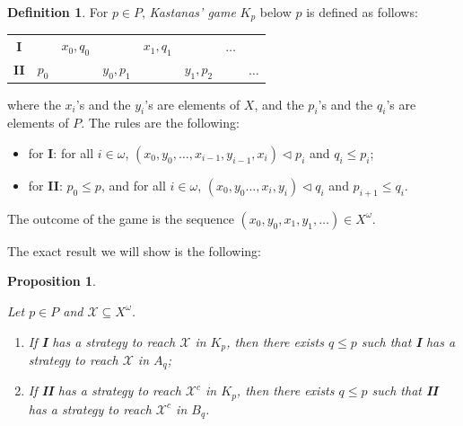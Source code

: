 \documentclass[a4paper,11pt]{article}
\newtheorem{prop}[thm]{Proposition}
\theoremstyle{definition}
\newtheorem{defin}[thm]{Definition}
\numberwithin{equation}{section}
\newcommand{\X}{\mathcal{X}}
\newcommand{\I}{\textbf{I}}
\newcommand{\II}{\textbf{II}}
\begin{document}
\begin{defin}

For $p \in P$, \emph{Kastanas' game} $K_p$ below $p$ is defined as follows:

\smallskip

\begin{tabular}{cccccccc}
\textbf{I} & & $x_0,  q_0$ & & $x_1,  q_1$ & & $\hdots$ \\
\textbf{II} & $p_0$ & & $y_0,  p_1$ & & $y_1,  p_2 $ & & $\hdots$ 
\end{tabular}

\smallskip

\noindent where the $x_i$'s and the $y_i$'s are elements of $X$, and the $p_i$'s and the $q_i$'s are elements of $P$. The rules are the following:

\begin{itemize}

\item for \textbf{I}: for all $i \in \omega$, $(x_0, y_0, \ldots, x_{i - 1}, y_{i - 1}, x_i) \vartriangleleft p_i$ and $q_i \leqslant p_i$;

\item for \textbf{II}: $p_0 \leqslant p$, and for all $i \in \omega$, $(x_0, y_0 \ldots, x_i, y_i) \vartriangleleft q_i$ and  $p_{i+1} \leqslant q_i$.

\end{itemize}

\noindent The outcome of the game is the sequence $(x_0, y_0, x_1, y_1, \ldots) \in X^\omega$.

\end{defin}

The exact result we will show is the following:

\begin{prop}\label{mainaux}

Let $p \in P$ and $\X \subseteq X^\omega$.

\begin{enumerate}

\item If \I{} has a strategy to reach $\X$ in $K_p$, then there exists $q\leqslant p$ such that \I{} has a strategy to reach $\X$ in $A_q$;

\item If \II{} has a strategy to reach $\X^c$ in $K_p$, then there exists $q\leqslant p$ such that \II{} has a strategy to reach $\X^c$ in $B_q$.

\end{enumerate}

\end{prop}
\end{document}
